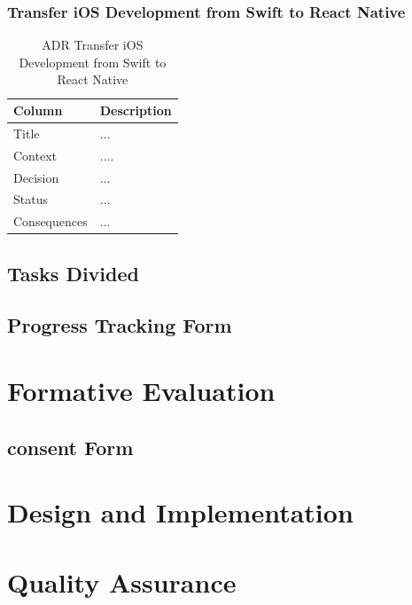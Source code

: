 \documentclass[12pt,a4paper]{article}
\begin{document}
\begin{appendices}
            \subsubsection{Transfer iOS Development from Swift to React Native}
              \begin{table}[H]
                \centering
                  \begin{tabularx}{\textwidth}{l X}
                    \hline
                    Column & Description  \\ \hline
                    Title & ... \\ 
                    Context & ....  \\ 
                    Decision & ...  \\ 
                    Status & ... \\ 
                    Consequences & ... \\                  
                    \hline
                  \end{tabularx}
                  \caption[Table caption text]{ADR Transfer iOS Development from Swift to React Native}
                  \label{table:ADR Transfer iOS Development from Swift to React Native}
              \end{table}

        \subsection{Tasks Divided}
        \subsection{Progress Tracking Form}\label{appendix:progress-tracking-form}
          
          
      \section{Formative Evaluation}
        \subsection{consent Form}\label{appendix:consent-form}
          
          
      \section{Design and Implementation}
        
      \section{Quality Assurance}

    \end{appendices}

  
\end{document}
